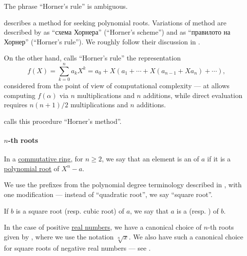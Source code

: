 \begin{remark}\label{rem:alg:horners_rule}
  The phrase \enquote{Horner's rule} is ambiguous.

   describes a method for seeking polynomial roots. Variations of method are described by  as \enquote{схема Хорнера} (\enquote{Horner's scheme}) and  as \enquote{правилото на Хорнер} (\enquote{Horner's rule}). We roughly follow their discussion in .

  On the other hand,  calls \enquote{Horner's rule} the representation
  \begin{equation}\label{eq:rem:alg:horners_rule/knuth}
    f(X) = \sum_{k=0}^n a_k X^k = a_0 + X (a_1 + \cdots + X(a_{n-1} + X a_n) + \cdots),
  \end{equation}
  considered from the point of view of computational complexity --- at allows computing \( f(\alpha) \) via \( n \) multiplications and \( n \) additions, while direct evaluation requires  \( {n(n+1)} / 2 \) multiplications and \( n \) additions.

   calls this procedure \enquote{Horner's method}.
\end{remark}

\paragraph{\( n \)-th roots}

\begin{definition}\label{def:nth_root}\mimprovised
  In a \hyperref[def:ring/commutative]{commutative ring}, for \( n \geq 2 \), we say that an element is an  of \( a \) if it is a \hyperref[def:root_of_polynomial]{polynomial root} of \( X^n - a \).

  We use the prefixes from the polynomial degree terminology described in , with one modification --- instead of \enquote{quadratic root}, we say \enquote{square root}.

  If \( b \) is a square root (resp. cubic root) of \( a \), we say that \( a \) is a  (resp. ) of \( b \).
\end{definition}
\begin{comments}
  \item In the case of positive \hyperref[def:real_numbers]{real numbers}, we have a canonical choice of \( n \)-th roots given by , where we use the notation \( \sqrt[n]{ x } \). We also have such a canonical choice for square roots of negative real numbers --- see .
\end{comments}

